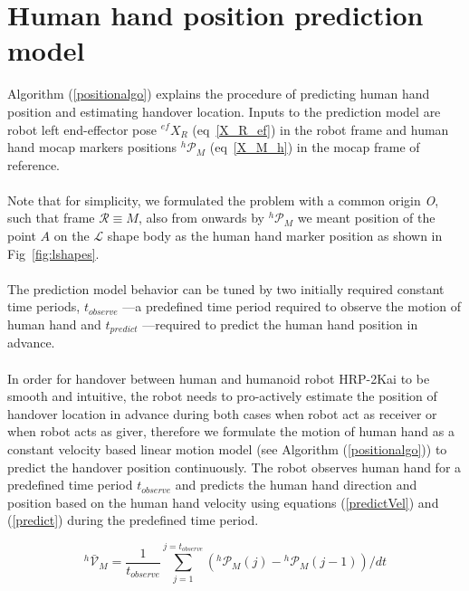 \documentclass[a4paper, 12pt, oneside]{Thesis}  %
\begin{document}
\clearpage

\section{Human hand position prediction model}\label{prediction_model}
Algorithm (\ref{positionalgo}) explains the procedure of predicting human hand position and estimating handover location. Inputs to the prediction model are robot left end-effector pose $\mathcal{}^{ef}{X}_R$ (eq~\ref{X_R_ef}) in the robot frame and human hand mocap markers positions ${}^{h}\mathcal{P}_M$ (eq~\ref{X_M_h}) in the mocap frame of reference.

\paragraph*{}
Note that for simplicity, we formulated the problem with a common origin {\it O}, such that frame $\mathcal R \equiv M$, also from onwards by ${}^{h}\mathcal{P}_M$ we meant position of the point $A$ on the $\mathcal{L}$ shape body as the human hand marker position as shown in Fig~\ref{fig:lshapes}.


\paragraph*{}
The prediction model behavior can be tuned by two initially required constant time periods, $t_{observe}$ ---a predefined time period required to observe the motion of human hand and $t_{predict}$ ---required to predict the human hand position in advance.

\paragraph*{}
In order for handover between human and humanoid robot HRP-2Kai to be smooth and intuitive, the robot needs to pro-actively estimate the position of handover location in advance during both cases when robot act as receiver or when robot acts as giver, therefore we formulate the motion of human hand as a constant velocity based linear motion model (see Algorithm (\ref{positionalgo})) to predict the handover position continuously. The robot observes human hand for a predefined time period $t_{observe}$ and predicts the human hand direction and position based on the human hand velocity using equations (\ref{predictVel}) and (\ref{predict}) during the predefined time period. 

\begin{equation} \label{predictVel}
{}^{h}\mathcal{\bar{V}}_{M} = \frac{1}{t_{observe}}{\sum_{j=1}^{j=t_{observe}} ({}^{h}\mathcal{P}_{M}(j)-{}^{h}\mathcal{P}_{M}(j-1))/dt }
\end{equation}
\end{document}
